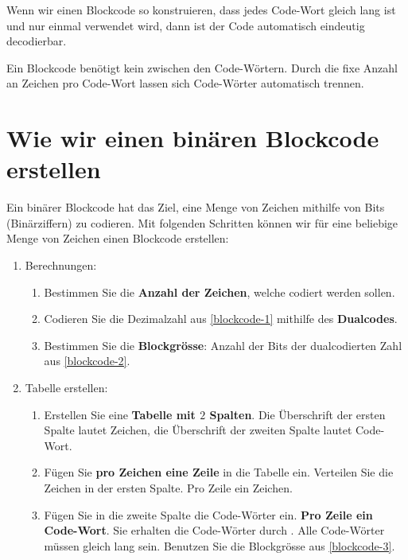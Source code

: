 \begin{important}
Wenn wir einen Blockcode so konstruieren, dass jedes Code-Wort gleich lang ist und nur einmal verwendet wird, dann ist der Code automatisch eindeutig decodierbar.
\end{important}

Ein Blockcode benötigt kein  zwischen den Code-Wörtern. Durch die fixe Anzahl an Zeichen pro Code-Wort lassen sich Code-Wörter automatisch trennen.

\section{Wie wir einen binären Blockcode erstellen}

Ein binärer Blockcode hat das Ziel, eine Menge von Zeichen mithilfe von Bits (Binärziffern) zu codieren. Mit folgenden Schritten können wir für eine beliebige Menge von Zeichen einen Blockcode erstellen:

\begin{enumerate}
\item Berechnungen:
\begin{enumerate}
\item Bestimmen Sie die \textbf{Anzahl der Zeichen}, welche codiert werden sollen. \label{blockcode-1}
\item Codieren Sie die Dezimalzahl aus \ref{blockcode-1} mithilfe des \textbf{Dualcodes}. \label{blockcode-2}
\item Bestimmen Sie die \textbf{Blockgrösse}: Anzahl der Bits der dualcodierten Zahl aus \ref{blockcode-2}. \label{blockcode-3}
\end{enumerate}
\item Tabelle erstellen:
\begin{enumerate}
\item Erstellen Sie eine \textbf{Tabelle mit $2$ Spalten}. Die Überschrift der ersten Spalte lautet Zeichen, die Überschrift der zweiten Spalte lautet Code-Wort.
\item Fügen Sie \textbf{pro Zeichen eine Zeile} in die Tabelle ein. Verteilen Sie die Zeichen in der ersten Spalte. Pro Zeile ein Zeichen.
\item Fügen Sie in die zweite Spalte die Code-Wörter ein. \textbf{Pro Zeile ein Code-Wort}. Sie erhalten die Code-Wörter durch . Alle Code-Wörter müssen gleich lang sein. Benutzen Sie die Blockgrösse aus \ref{blockcode-3}.
\end{enumerate}
\end{enumerate}

